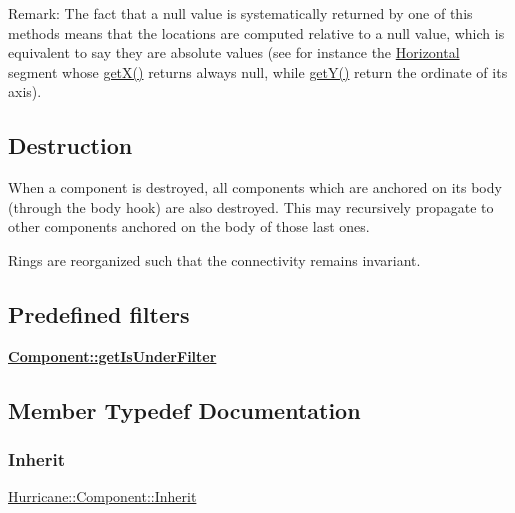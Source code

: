 \begin{DoxyParagraph}{Remark\+: The fact that a null value is systematically returned by one }
of this methods means that the locations are computed relative to a null value, which is equivalent to say they are absolute values (see for instance the \mbox{\hyperlink{classHurricane_1_1Horizontal}{Horizontal}} segment whose \mbox{\hyperlink{classHurricane_1_1Component_a0f8299ed73705fd4fbf56589dcc7e074}{get\+X()}} returns always null, while \mbox{\hyperlink{classHurricane_1_1Component_a727da3f127c3a7a0a09468219f98c3e6}{get\+Y()}} return the ordinate of its axis).
\end{DoxyParagraph}
\hypertarget{classHurricane_1_1Component_secComponentDestruction}{}\subsection{Destruction}\label{classHurricane_1_1Component_secComponentDestruction}
When a component is destroyed, all components which are anchored on its body (through the body hook) are also destroyed. This may recursively propagate to other components anchored on the body of those last ones.

Rings are reorganized such that the connectivity remains invariant.\hypertarget{classHurricane_1_1Component_secComponentPredefinedFilters}{}\subsection{Predefined filters}\label{classHurricane_1_1Component_secComponentPredefinedFilters}
{\bfseries \mbox{\hyperlink{classHurricane_1_1Component_a8680f2756892366db8642bfcfd7ce097}{Component\+::get\+Is\+Under\+Filter}}} 

\subsection{Member Typedef Documentation}
\mbox{\label{classHurricane_1_1Component_a3911e94f9d220eb809d349b1181034e3}} 
\subsubsection{\texorpdfstring{Inherit}{Inherit}}
{\footnotesize\ttfamily \mbox{\hyperlink{classHurricane_1_1Component_a3911e94f9d220eb809d349b1181034e3}{Hurricane\+::\+Component\+::\+Inherit}}}

